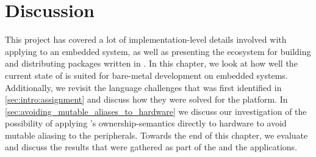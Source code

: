 
\chapter{Discussion}
\label{chap:discussion}

This project has covered a lot of implementation-level details involved with applying {\rust} to an embedded system, as well as presenting the ecosystem for building and distributing packages written in {\rust}.
In this chapter, we look at how well the current state of {\rust} is suited for bare-metal development on embedded systems.
Additionally, we revisit the language challenges that was first identified in \autoref{sec:intro:assignment} and discuss how they were solved for the {\rg} platform.
In \autoref{sec:avoiding_mutable_aliases_to_hardware} we discuss our investigation of the possibility of applying {\rust}'s ownership-semantics directly to hardware to avoid mutable aliasing to the peripherals.
Towards the end of this chapter, we evaluate and discuss the results that were gathered as part of the {\tracker} and the {\cg} applications.





